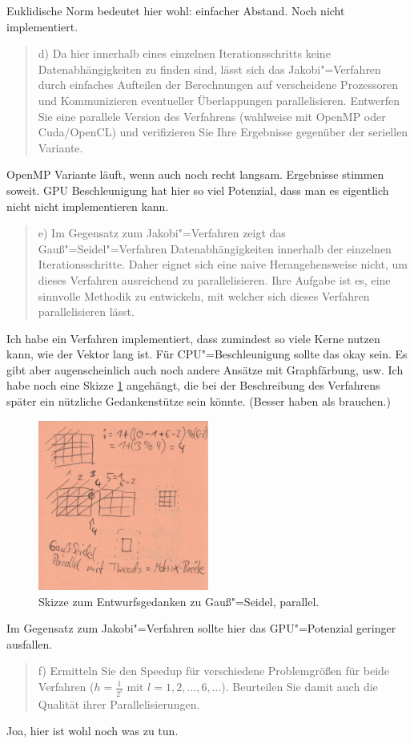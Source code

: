 \documentclass[paper = a4]{scrartcl}
\begin{document}
Euklidische Norm bedeutet hier wohl: einfacher Abstand. Noch nicht implementiert.

\begin{quote}
    d) Da hier innerhalb eines einzelnen Iterationsschritts keine Datenabhängigkeiten zu finden sind, lässt sich das Jakobi"=Verfahren durch einfaches Aufteilen der Berechnungen auf verscheidene Prozessoren und Kommunizieren eventueller Überlappungen parallelisieren. Entwerfen Sie eine parallele Version des Verfahrens (wahlweise mit OpenMP oder Cuda/OpenCL) und verifizieren Sie Ihre Ergebnisse gegenüber der seriellen Variante.
\end{quote}

OpenMP Variante läuft, wenn auch noch recht langsam. Ergebnisse stimmen soweit. GPU Beschleunigung hat hier so viel Potenzial, dass man es eigentlich nicht nicht implementieren kann.

\begin{quote}
    e) Im Gegensatz zum Jakobi"=Verfahren zeigt das Gauß"=Seidel"=Verfahren Datenabhängigkeiten innerhalb der einzelnen Iterationsschritte. Daher eignet sich eine naive Herangehensweise nicht, um dieses Verfahren ausreichend zu parallelisieren. Ihre Aufgabe ist es, eine sinnvolle Methodik zu entwickeln, mit welcher sich dieses Verfahren parallelisieren lässt.
\end{quote}

Ich habe ein Verfahren implementiert, dass zumindest so viele Kerne nutzen kann, wie der Vektor lang ist. Für CPU"=Beschleunigung sollte das okay sein. Es gibt aber augenscheinlich auch noch andere Ansätze mit Graphfärbung, usw. Ich habe noch eine Skizze \ref{fig:gaussseidelskizze} angehängt, die bei der Beschreibung des Verfahrens später ein nützliche Gedankenstütze sein könnte. (Besser haben als brauchen.)

\begin{figure}
    \centering
    \includegraphics[width=0.5\textwidth]{gaussseidelskizze}
    \caption{Skizze zum Entwurfsgedanken zu Gauß"=Seidel, parallel.}
    \label{fig:gaussseidelskizze}
\end{figure}

Im Gegensatz zum Jakobi"=Verfahren sollte hier das GPU"=Potenzial geringer ausfallen.

\begin{quote}
    f) Ermitteln Sie den Speedup für verschiedene Problemgrößen für beide Verfahren (\(h = \frac{1}{2^l} \text{ mit } l = 1, 2, \dots, 6, \dots\)). Beurteilen Sie damit auch die Qualität ihrer Parallelisierungen.
\end{quote}

Joa, hier ist wohl noch was zu tun.
\end{document}

